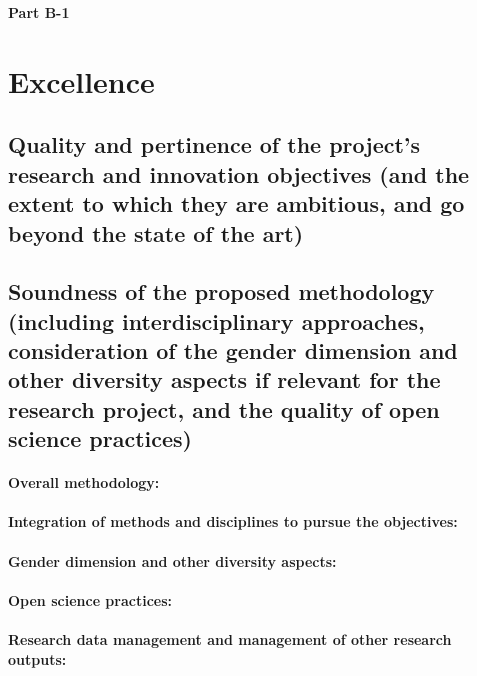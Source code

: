 \documentclass[a4paper,11pt]{article}
\begin{document}
\begin{center}
\Huge{\textbf{Part B-1}}
\end{center}%
\vspace{-0.5cm}%
\section{Excellence}
\subsection{Quality and pertinence of the project's research and innovation objectives (and the extent to which they are ambitious, and go beyond the state of the art)}\label{sec:proposal}




\citereset%

\subsection{Soundness of the proposed methodology (including interdisciplinary approaches, consideration of the gender dimension and other diversity aspects if relevant for the research project, and the quality of open science practices)}


\paragraph{Overall methodology:}


\paragraph{Integration of methods and disciplines to pursue the objectives:}

\paragraph{Gender dimension and other diversity aspects:}

\paragraph{Open science practices:}

\paragraph{Research data management and management of other research outputs:}
\end{document}
